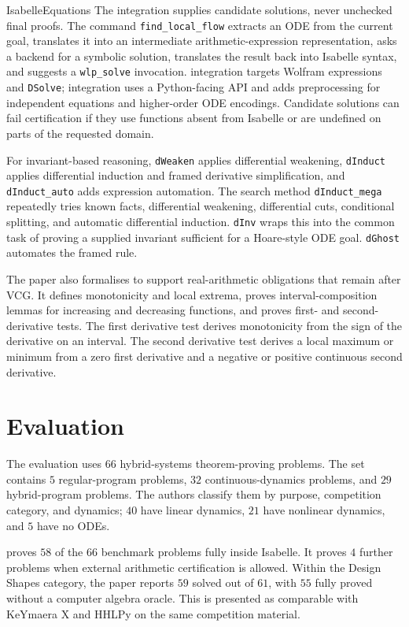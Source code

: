 \documentclass[hidelinks]{article}
\begin{document}
\begin{smodule}[title={IsaVODEs: Interactive Verification of Cyber-Physical Systems at Scale}]{IsabelleEquations}
The  integration supplies candidate solutions, never unchecked final proofs.
The command \texttt{find\_local\_flow} extracts an ODE from the current goal, translates it into an intermediate arithmetic-expression representation, asks a backend for a symbolic solution, translates the result back into Isabelle syntax, and suggests a \texttt{wlp\_solve} invocation.
 integration targets Wolfram expressions and \texttt{DSolve};  integration uses a Python-facing API and adds preprocessing for independent equations and higher-order ODE encodings.
Candidate solutions can fail certification if they use functions absent from Isabelle or are undefined on parts of the requested domain.

For invariant-based reasoning, \texttt{dWeaken} applies differential weakening, \texttt{dInduct} applies differential induction and framed derivative simplification, and \texttt{dInduct\_auto} adds expression automation.
The search method \texttt{dInduct\_mega} repeatedly tries known facts, differential weakening, differential cuts, conditional splitting, and automatic differential induction.
\texttt{dInv} wraps this into the common task of proving a supplied invariant sufficient for a Hoare-style ODE goal.
\texttt{dGhost} automates the framed  rule.

The paper also formalises  to support real-arithmetic obligations that remain after VCG.
It defines monotonicity and local extrema, proves interval-composition lemmas for increasing and decreasing functions, and proves first- and second-derivative tests.
The first derivative test derives monotonicity from the sign of the derivative on an interval.
The second derivative test derives a local maximum or minimum from a zero first derivative and a negative or positive continuous second derivative.

\section{Evaluation}

The evaluation uses \(66\)  hybrid-systems theorem-proving problems.
The set contains \(5\) regular-program problems, \(32\) continuous-dynamics problems, and \(29\) hybrid-program problems.
The authors classify them by purpose, competition category, and dynamics; \(40\) have linear dynamics, \(21\) have nonlinear dynamics, and \(5\) have no ODEs.

 proves \(58\) of the \(66\) benchmark problems fully inside Isabelle.
It proves \(4\) further problems when external arithmetic certification is allowed.
Within the Design Shapes category, the paper reports \(59\) solved out of \(61\), with \(55\) fully proved without a computer algebra oracle.
This is presented as comparable with KeYmaera X and HHLPy on the same competition material.


\end{smodule}
\end{document}
